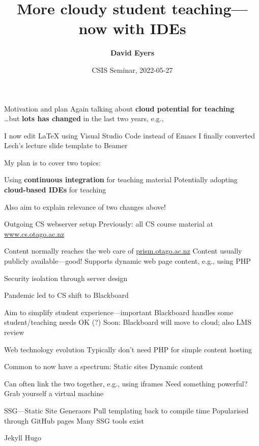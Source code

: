 \documentclass[aspectratio=169,t]{beamer}
\title[2022-05-27---CSIS Seminar---David Eyers]{More cloudy student teaching---now with IDEs}
\date{CSIS Seminar, 2022-05-27}
\author{\textbf{David Eyers}}
\begin{document}
\begin{frame}
  \titlepage
\end{frame}

\begin{dframe}{Motivation and plan}
  \1 Again talking about \textbf{cloud potential for teaching}\\
     \dots but \textbf{lots has changed} in the last two years, e.g.,

  \2 I now edit \LaTeX{} using Visual Studio Code instead of Emacs
  \2 I finally converted Lech's lecture slide template to Beamer
  
  \bigskip

  \1 My plan is to cover two topics:

  \2 Using \textbf{continuous integration} for teaching material
  \2 Potentially adopting \textbf{cloud-based IDEs} for teaching

  \bigskip

  \1 Also aim to explain relevance of two changes above!

\end{dframe}

\begin{dframe}{Outgoing CS webserver setup}
  \1 Previously: all CS course material at \url{www.cs.otago.ac.nz}

  \2 Content normally reaches the web care of \url{prism.otago.ac.nz}
  \2 Content usually publicly available---good!
  \2 Supports dynamic web page content, e.g., using PHP
  
  \3 Security isolation through server design

  \medskip

  \1 Pandemic led to CS shift to Blackboard

  \2 Aim to simplify student experience---important
  \2 Blackboard handles some student/teaching needs OK (?)
  \2 Soon: Blackboard will move to cloud; also LMS review
\end{dframe}

\begin{dframe}{Web technology evolution}
  \1 Typically don't need PHP for simple content hosting
  
  \2 Common to now have a spectrum:
  \2 Static sites
  \2 Dynamic content

  \1 Can often link the two together, e.g., using iframes
  \1 Need something powerful? Grab yourself a virtual machine
\end{dframe}

\begin{dframe}{SSG---Static Site Generaors}
  \1 Pull templating back to compile time
  \1 Popularised through GitHub pages
  \1 Many SSG tools exist

  \2 Jekyll
  \2 Hugo
\end{dframe}
\end{document}
